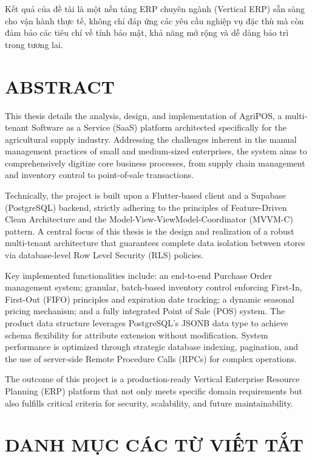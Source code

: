 \documentclass[13pt, a4paper]{report}
\begin{document}
Kết quả của đề tài là một nền tảng ERP chuyên ngành (Vertical ERP) sẵn sàng cho vận hành thực tế, không chỉ đáp ứng các yêu cầu nghiệp vụ đặc thù mà còn đảm bảo các tiêu chí về tính bảo mật, khả năng mở rộng và dễ dàng bảo trì trong tương lai.



\clearpage
\chapter*{ABSTRACT}
This thesis details the analysis, design, and implementation of AgriPOS, a multi-tenant Software as a Service (SaaS) platform architected specifically for the agricultural supply industry. Addressing the challenges inherent in the manual management practices of small and medium-sized enterprises, the system aims to comprehensively digitize core business processes, from supply chain management and inventory control to point-of-sale transactions.

Technically, the project is built upon a Flutter-based client and a Supabase (PostgreSQL) backend, strictly adhering to the principles of Feature-Driven Clean Architecture and the Model-View-ViewModel-Coordinator (MVVM-C) pattern. A central focus of this thesis is the design and realization of a robust multi-tenant architecture that guarantees complete data isolation between stores via database-level Row Level Security (RLS) policies.

Key implemented functionalities include: an end-to-end Purchase Order management system; granular, batch-based inventory control enforcing First-In, First-Out (FIFO) principles and expiration date tracking; a dynamic seasonal pricing mechanism; and a fully integrated Point of Sale (POS) system. The product data structure leverages PostgreSQL's JSONB data type to achieve schema flexibility for attribute extension without modification. System performance is optimized through strategic database indexing, pagination, and the use of server-side Remote Procedure Calls (RPCs) for complex operations.

The outcome of this project is a production-ready Vertical Enterprise Resource Planning (ERP) platform that not only meets specific domain requirements but also fulfills critical criteria for security, scalability, and future maintainability.


\clearpage
\chapter*{DANH MỤC CÁC TỪ VIẾT TẮT}
\end{document}
